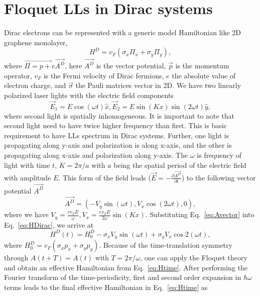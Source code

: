 \section{Floquet LLs in Dirac systems}
Dirac electrons can be represented with a generic model Hamiltonian like 2D graphene monolayer,
\begin{equation}\label{eq:HDirac}
	H^D=v_F(\sigma _{x}\Pi _{x}+\sigma _{y}\Pi _{y}),
\end{equation}%
where $\vec{\Pi =p+}e\vec{A^D}$, here $\vec{A^D}$ is the vector
potential, $\vec{p}$ is the momentum operator, $v_F$ is the Fermi
velocity of Dirac fermions, $e$ the absolute value of electron charge,
and $\vec{\sigma}$ the Pauli matrices vector in 2D. We have two linearly polarized laser lights with the electric field components
\begin{equation} \label{eq:Efield}
\vec{E}_{1} =E\cos (\omega t)\hat{x},\vec{E}_{2}=E\sin
(Kx)\sin (2\omega t)\hat{y},
\end{equation}%
where second light is spatially inhomogeneous. It is important to note that second light need to have twice higher frequency than first. This is basic requirement to have LLs spectrum in Dirac systems. Further, one light is propagating along y-axis and polarization is along x-axis, and the other is propagating along x-axis and polarization along y-axis. The $\omega $ is frequency of light with time $t$, $%
K=2\pi /a$ with $a$ being the spatial period of the electric field with
amplitude $E$. This form of the field leads ($\vec{E}=-\frac{\partial \vec{A^D}}{\partial t}$) to the following vector potential $\vec{A^D}$
\begin{equation}\label{eq:Avector}
\vec{A^D}=(-V_y\sin (\omega t), V_x \cos (2\omega t),0),
\end{equation}%
where we have $V_{y}=\frac{ev_FE}{\omega },V_{x}=\frac{ev_FE}{2\omega }\sin(Kx)$. Substituting Eq.~\eqref{eq:Avector} into Eq.~\eqref{eq:HDirac}, we arrive at%
\begin{equation}\label{eq:Htime}
H^D(t)=H_{0}^D- \sigma _{x}V_{y}\sin (\omega t)+\sigma _{y}V_{x}\cos 2(\omega
t),
\end{equation}%
where $H_{0}^D=v_F(\sigma _{x} p_{x}+\sigma_{y} p_{y})$. Because of the time-translation symmetry through $A(t+T)=A(t)$ with $T=2\pi /\omega $, one can apply the Floquet theory \cite{AEE, MBL, supp} and obtain an effective Hamiltonian from Eq.~\eqref{eq:Htime}. After performing the Fourier transform of the time-periodicity, first and second order expansion in $\hbar\omega$ terms leads to the final effective Hamiltonian in Eq.~\eqref{eq:Htime} as
